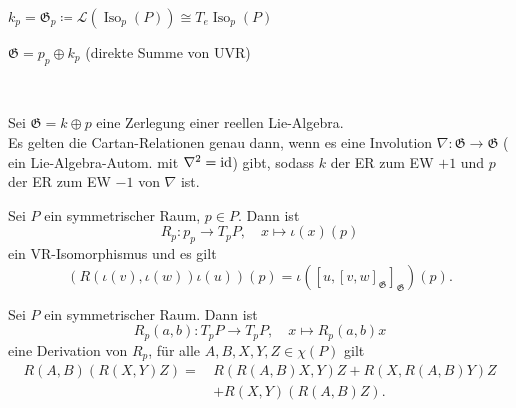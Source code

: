 \documentclass{cheat-sheet}
\DeclareMathOperator{\Iso}{Iso} %
\newcommand{\Gie}{\mathfrak{G}} %
\begin{document}

\begin{prop}
  $k_p = \mathfrak{G}_p \coloneqq \mathcal{L}(\Iso_p(P)) \cong T_e \Iso_p(P)$
\end{prop}

\iffalse
\begin{lem}
  $p_p \cap k_p = \{ 0 \}$
\end{lem}
\fi

\begin{prop}
  $\Gie = p_p \oplus k_p$ (direkte Summe von UVR)
\end{prop}

\begin{prop}\mbox{}\\
  \inlineitem{$[k_p, k_p]_\Gie \subseteq k_p$} \quad
  \inlineitem{$[k_p, p_p]_\Gie \subseteq p_p$} \quad
  \inlineitem{$[p_p, p_p]_\Gie \subseteq k_p$}
\end{prop}

\begin{prop}
  Sei $\Gie = k \oplus p$ eine Zerlegung einer reellen Lie-Algebra. \\
  Es gelten die Cartan-Relationen genau dann, wenn es eine Involution $\nabla : \Gie \to \Gie$ (\dh{} ein Lie-Algebra-Autom. mit $\nabla^2 = \operatorname{id}$) gibt, sodass $k$ der ER zum EW $+1$ und $p$ der ER zum EW $-1$ von $\nabla$ ist.
\end{prop}

\begin{prop}
  Sei $P$ ein symmetrischer Raum, $p \in P$. Dann ist
  \[
    R_p : p_p \to T_p P, \quad
    x \mapsto \iota(x)(p)
  \]
  ein VR-Isomorphismus und es gilt
  \[ (R(\iota(v), \iota(w)) \iota(u))(p) = \iota([u, [v, w]_\Gie]_\Gie)(p). \]
\end{prop}

\begin{kor}
  Sei $P$ ein symmetrischer Raum. Dann ist
  \[
    R_p(a, b) : T_p P \to T_p P, \quad
    x \mapsto R_p(a, b) x
  \]
  eine Derivation von $R_p$, \dh{} für alle $A, B, X, Y, Z \in \chi(P)$ gilt
  \begin{align*}
    R(A, B)(R(X, Y)Z) = \, & R(R(A, B)X, Y)Z + R(X, R(A, B)Y)Z \\
    & + R(X, Y)(R(A, B)Z).
  \end{align*}
\end{kor}

\end{document}
